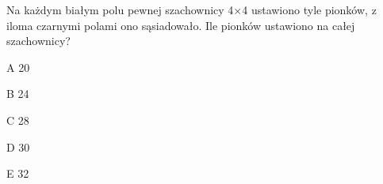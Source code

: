 \begin{tresc}
Na każdym białym polu pewnej szachownicy 4×4 ustawiono tyle pionków, z iloma czarnymi polami ono sąsiadowało. Ile pionków ustawiono na całej szachownicy?
\end{tresc}
\begin{wariant}{A} 20 \end{wariant}
\begin{wariant}{B} 24 \end{wariant}
\begin{wariant}{C} 28 \end{wariant}
\begin{wariant}{D} 30 \end{wariant}
\begin{wariant}{E} 32 \end{wariant}
